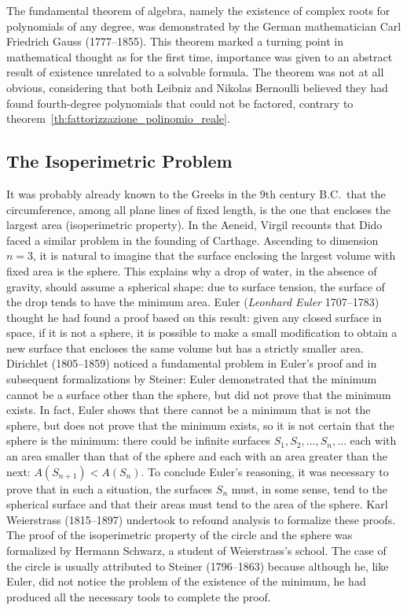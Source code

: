 The fundamental theorem of algebra, namely the existence of complex roots 
for polynomials of any degree, was demonstrated by 
the German mathematician Carl Friedrich Gauss (1777--1855). 
This theorem marked a turning point in mathematical thought as 
for the first time, importance was given to an abstract result of existence 
unrelated to a solvable formula. 
The theorem was not at all obvious, considering that both Leibniz 
and Nikolas Bernoulli believed they had found fourth-degree polynomials 
that could not be factored, contrary 
to theorem~\ref{th:fattorizzazione_polinomio_reale}.

\subsection{The Isoperimetric Problem}

\label{note:isoperimetrico}%
%
It was probably already known to the Greeks in the 9th century B.C.\ that 
the circumference, among all plane lines of fixed length, 
is the one that encloses the largest area (isoperimetric property).
In the Aeneid, Virgil recounts that Dido faced 
a similar problem in the founding of Carthage.
%
%
%
%
Ascending to dimension $n=3$, it is natural to imagine that 
the surface enclosing the largest volume with fixed area 
is the sphere. 
This explains why a drop of water, in the absence of gravity,
should assume a spherical shape: due to surface tension, 
the surface of the drop tends to have the minimum area.
Euler (\emph{Leonhard Euler} 1707--1783)
%
%
thought he had
found a proof
based on this result:
given any closed surface in space,
if it is not a sphere, it is possible
to make a small modification to obtain a new surface
that encloses the same volume but has a strictly smaller area.
Dirichlet (1805--1859) noticed a fundamental problem 
in Euler's proof and in subsequent formalizations by Steiner:
Euler demonstrated that the minimum cannot be a surface other than the sphere,
but did not prove that the minimum exists.
In fact, Euler shows that there cannot be a minimum that is not the sphere, 
but does not prove that the minimum exists, so it is not certain that the sphere
is the minimum:
there could be infinite surfaces $S_1, S_2, \dots, S_n, \dots$ 
each with an area smaller than that of the sphere and each with an area greater
than the next:
$A(S_{n+1})< A(S_n)$. 
To conclude Euler's reasoning, it was necessary to prove 
that in such a situation, the surfaces $S_n$ must, in some sense, 
tend to the spherical surface and that their areas must
tend to the area of the sphere. 
Karl Weierstrass (1815--1897)
%
undertook to refound analysis to formalize these proofs.
The proof of the isoperimetric property of the circle and the sphere was 
formalized by Hermann Schwarz, 
%
a student of Weierstrass's school.
The case of the circle is usually attributed to Steiner (1796--1863) because 
although he, like Euler, did not notice the problem of the existence of the
minimum,
he had produced all the necessary tools to complete the proof. 

